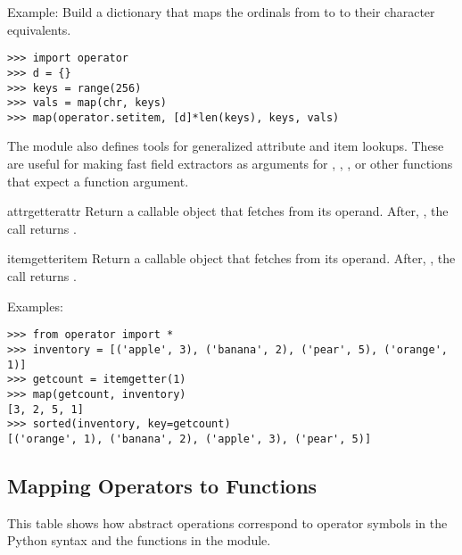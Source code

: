 Example: Build a dictionary that maps the ordinals from  to
 to their character equivalents.

\begin{verbatim}
>>> import operator
>>> d = {}
>>> keys = range(256)
>>> vals = map(chr, keys)
>>> map(operator.setitem, [d]*len(keys), keys, vals)
\end{verbatim}


The  module also defines tools for generalized attribute
and item lookups.  These are useful for making fast field extractors
as arguments for , ,
, or other functions that expect a
function argument.

\begin{funcdesc}{attrgetter}{attr}
Return a callable object that fetches  from its operand.
After, , the call  returns
.
\end{funcdesc}
    
\begin{funcdesc}{itemgetter}{item}
Return a callable object that fetches  from its operand.
After, , the call  returns
.
\end{funcdesc}

Examples:
                
\begin{verbatim}
>>> from operator import *
>>> inventory = [('apple', 3), ('banana', 2), ('pear', 5), ('orange', 1)]
>>> getcount = itemgetter(1)
>>> map(getcount, inventory)
[3, 2, 5, 1]
>>> sorted(inventory, key=getcount)
[('orange', 1), ('banana', 2), ('apple', 3), ('pear', 5)]
\end{verbatim}
                

\subsection{Mapping Operators to Functions \label{operator-map}}

This table shows how abstract operations correspond to operator
symbols in the Python syntax and the functions in the
 module.


